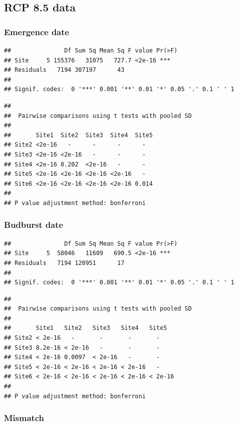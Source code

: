 \documentclass[12 pt]{article}
\begin{document}
\subsection{RCP 8.5 data}
\subsubsection*{Emergence date}


\begin{verbatim}
##               Df Sum Sq Mean Sq F value Pr(>F)    
## Site     5 155376   31075   727.7 <2e-16 ***
## Residuals   7194 307197      43                   
## 
## Signif. codes:  0 '***' 0.001 '**' 0.01 '*' 0.05 '.' 0.1 ' ' 1
\end{verbatim}

\begin{verbatim}
## 
##  Pairwise comparisons using t tests with pooled SD 
## 
##       Site1  Site2  Site3  Site4  Site5
## Site2 <2e-16   -      -      -      -    
## Site3 <2e-16 <2e-16   -      -      -    
## Site4 <2e-16 0.202  <2e-16   -      -    
## Site5 <2e-16 <2e-16 <2e-16 <2e-16   -    
## Site6 <2e-16 <2e-16 <2e-16 <2e-16 0.014
## 
## P value adjustment method: bonferroni
\end{verbatim}

\subsubsection*{Budburst date}

\begin{verbatim}
##               Df Sum Sq Mean Sq F value Pr(>F)    
## Site     5  58046   11609   690.5 <2e-16 ***
## Residuals   7194 120951      17                   
## 
## Signif. codes:  0 '***' 0.001 '**' 0.01 '*' 0.05 '.' 0.1 ' ' 1
\end{verbatim}

\begin{verbatim}
## 
##  Pairwise comparisons using t tests with pooled SD 
##  
##       Site1   Site2   Site3   Site4   Site5  
## Site2 < 2e-16   -       -       -       -      
## Site3 8.2e-16 < 2e-16   -       -       -      
## Site4 < 2e-16 0.0097  < 2e-16   -       -      
## Site5 < 2e-16 < 2e-16 < 2e-16 < 2e-16   -      
## Site6 < 2e-16 < 2e-16 < 2e-16 < 2e-16 < 2e-16
## 
## P value adjustment method: bonferroni
\end{verbatim}

\subsubsection*{Mismatch}
\end{document}
